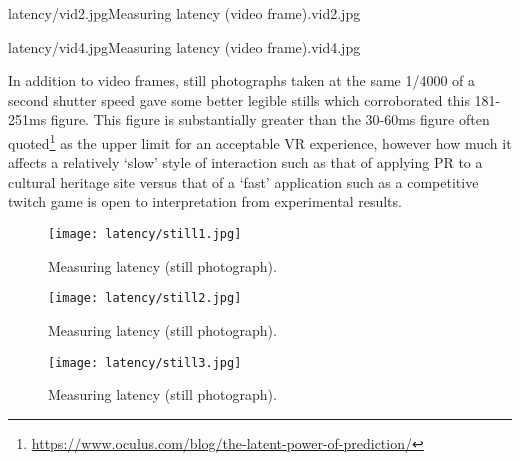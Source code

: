        {latency/vid2.jpg}{Measuring latency (video frame).}{vid2.jpg}

       {latency/vid4.jpg}{Measuring latency (video frame).}{vid4.jpg}

In addition to video frames, still photographs taken at the same 1/4000 of a second shutter speed gave some better legible stills which corroborated this 181-251ms figure. This figure is substantially greater than the 30-60ms figure often quoted\footnote{\url{https://www.oculus.com/blog/the-latent-power-of-prediction/}} as the upper limit for an acceptable VR experience, however how much it affects a relatively `slow' style of interaction such as that of applying PR to a cultural heritage site versus that of a `fast' application such as a competitive twitch game is open to interpretation from experimental results.

\begin{figure}[h]
    \begin{center}
    \begin{minipage}{.32\textwidth}
        \begin{center}
        \texttt{[image: latency/still1.jpg]}
        \caption{Measuring latency (still photograph).}
        \label{still1.jpg}
        \end{center}
    \end{minipage}%
    \hspace{.01\textwidth}
    \begin{minipage}{.32\textwidth}
		\begin{center}
        \texttt{[image: latency/still2.jpg]}
        \caption{Measuring latency (still photograph).}
        \label{still2.jpg}
        \end{center}
    \end{minipage}%
    \hspace{.01\textwidth}
    \begin{minipage}{.32\textwidth}
        \begin{center}
        \texttt{[image: latency/still3.jpg]}
        \caption{Measuring latency (still photograph).}
        \label{still3.jpg}
        \end{center}
    \end{minipage}
    \end{center}
\end{figure}

